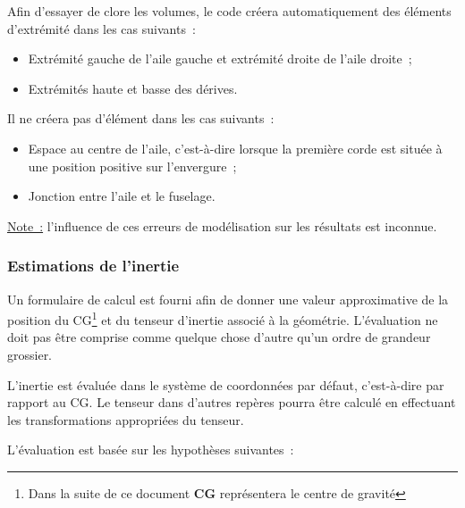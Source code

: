 \documentclass[a4paper,twoside,12pt,dvips]{article}
\begin{document}
Afin d’essayer de clore les volumes, le code créera automatiquement des éléments d’extrémité dans les cas suivants~:

\begin{itemize}
	\item Extrémité gauche de l’aile gauche et extrémité droite de l’aile 
	droite~;
	\item Extrémités haute et basse des dérives.
\end{itemize}

Il ne créera pas d’élément dans les cas suivants~:

\begin{itemize}
	\item Espace au centre de l’aile, c’est-à-dire lorsque la première corde est 
	située à une position positive sur l’envergure~;
	\item Jonction entre l’aile et le fuselage.
\end{itemize}

\underline{Note~:} l’influence de ces erreurs de modélisation sur les résultats est inconnue.

\subsubsection{Estimations de l’inertie}

Un formulaire  de calcul est fourni afin de donner une valeur approximative de la position du CG\footnote{Dans la suite de ce document \textbf{CG} représentera le centre de gravité} et du tenseur d’inertie associé à la géométrie. L’évaluation ne doit pas être comprise comme quelque chose d’autre qu’un ordre de grandeur grossier.

L’inertie est évaluée dans le système de coordonnées par défaut, c’est-à-dire par rapport au CG. Le tenseur dans d’autres repères pourra être calculé en effectuant les transformations appropriées du tenseur.

L’évaluation est basée sur les hypothèses suivantes~:
\end{document}
